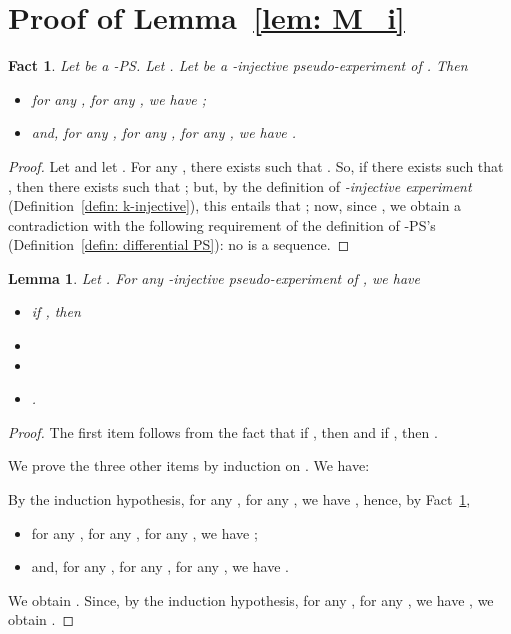 \documentclass{article}
\theoremstyle{plain}
\newtheorem{lem}[theorem]{Lemma}
\newtheorem{fact}[theorem]{Fact}
\begin{document}
\section{Proof of Lemma~\ref{lem: M_i}}




\begin{fact}\label{fact: M_0 pairwise disjoint}
Let  be a -PS. 
Let . Let  be a -injective pseudo-experiment of . Then 
\begin{itemize}
\item for any , for any , we have ;
\item and, for any , for any , for any , we have .
\end{itemize}
\end{fact}

\begin{proof}
Let  and let . For any , there exists  such that . So, if there exists  such that , then there exists  such that ; but, by the definition of \emph{-injective experiment} (Definition~\ref{defin: k-injective}), this entails that ; now, since , we obtain a contradiction with the following requirement of the definition of -PS's (Definition~\ref{defin: differential PS}): no  is a sequence.
\end{proof}

\begin{lem}\label{lem: M_1}
Let . 
For any -injective pseudo-experiment  of , we have 
\begin{itemize}
\item if , then 
\item 
\item 
\item .
\end{itemize}
\end{lem}

\begin{proof}
The first item follows from the fact that if , then  and if , then . 

We prove the three other items by induction on . We have:

By the induction hypothesis, for any , for any , we have , hence, by Fact~\ref{fact: M_0 pairwise disjoint},
\begin{itemize}
\item for any , for any , for any , we have ;
\item and, for any , for any , for any , we have .
\end{itemize}
We obtain . Since, by the induction hypothesis, for any , for any , we have , we obtain .
\end{proof}
\end{document}
